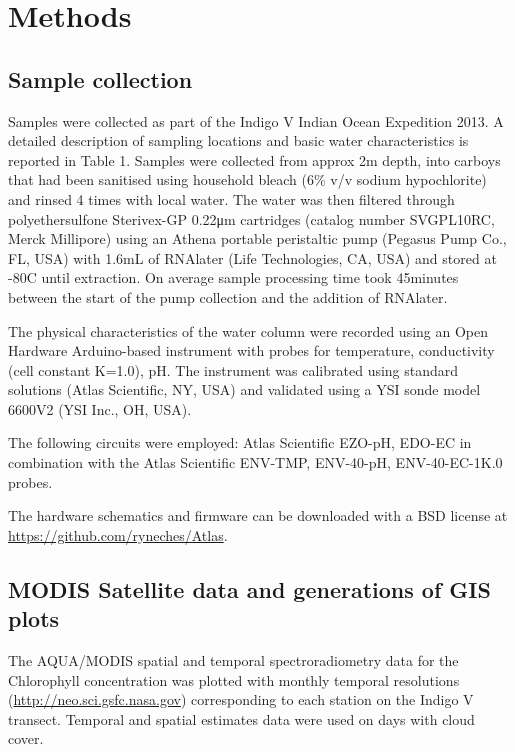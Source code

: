 \section{Methods}

\subsection{Sample collection}

Samples were collected as part of the Indigo V Indian Ocean Expedition 2013.\cite{lauro_common_2014} A detailed description of sampling locations and basic water characteristics is reported in Table 1. Samples were collected from approx 2m depth, into carboys that had been sanitised using household bleach (6\% v/v sodium hypochlorite) and rinsed 4 times with local water. The water was then filtered through polyethersulfone Sterivex-GP 0.22\si{\micro\meter} cartridges (catalog number SVGPL10RC, Merck Millipore) using an Athena portable peristaltic pump (Pegasus Pump Co., FL, USA) with 1.6mL of RNAlater (Life Technologies, CA, USA) and stored at -80\degree C until extraction. On average sample processing time took 45minutes between the start of the pump collection and the addition of RNAlater.

The physical characteristics of the water column were recorded using an Open Hardware Arduino-based instrument with probes for temperature, conductivity (cell constant K=1.0), pH. The instrument was calibrated using standard solutions (Atlas Scientific, NY, USA) and validated using a YSI sonde model 6600V2 (YSI Inc., OH, USA).

The following circuits were employed: Atlas Scientific EZO-pH, EDO-EC in combination with the Atlas Scientific ENV-TMP, ENV-40-pH, ENV-40-EC-1K.0 probes.

The hardware schematics and firmware can be downloaded with a BSD license at \url{https://github.com/ryneches/Atlas}.

\subsection{MODIS Satellite data and generations of GIS plots}

The AQUA/MODIS \cite{mcclain_decade_2009} spatial and temporal spectroradiometry data for the Chlorophyll concentration was plotted with monthly temporal resolutions (\url{http://neo.sci.gsfc.nasa.gov}) corresponding to each station on the Indigo V transect. Temporal and spatial estimates data were used on days with cloud cover.

